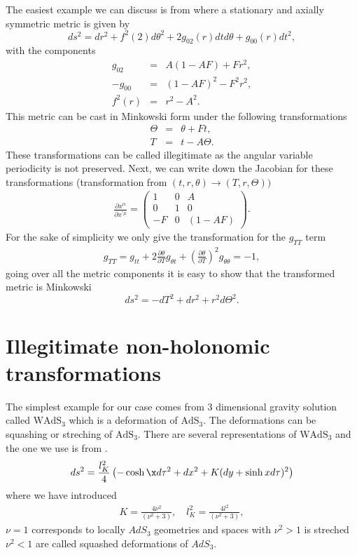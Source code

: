 \documentclass[preprint,aps,tightenlines,showkeys,nofootinbib,superscriptaddress,amsmath]{revtex4}
\begin{document}
The easiest example we can discuss is from \cite{Deser:1985pk} where a
stationary and axially symmetric metric is given by
\begin{equation}
  ds^{2}= dr^{2}+f^{2}(2)d \theta^{2}+2g_{02}(r)dt d\theta +g_{00}(r)dt^{2},
\end{equation}
with the components
\begin{eqnarray}
  g_{02}& = &A(1-AF)+Fr^{2},\\
  -g_{00}& =&(1-AF)^{2}-F^{2}r^{2},\\
  f^{2}(r)&=&r^{2}-A^{2}.
\end{eqnarray}
This metric can be cast in Minkowski form under the following transformations
\begin{eqnarray}
  \Theta &=&\theta+Ft,\\
  T &=&t-A\Theta.
\end{eqnarray}
These transformations can be called illegitimate as the angular
variable periodicity is not preserved. Next, we can write down the
Jacobian for these transformations (transformation from
$(t,r,\theta)\rightarrow (T,r,\Theta))$
\begin{eqnarray}
  \frac{\partial x^{\alpha} }{\partial x^{\prime\mu} }=
  \begin{pmatrix}
    1 & 0 & A \\
    0 & 1 & 0 \\
    -F & 0 & (1-AF)
  \end{pmatrix}.
\end{eqnarray}
For the sake of simplicity we only give the transformation for the $g_{TT}$ term
\begin{eqnarray}
  g_{TT}=g_{tt}+2 \frac{\partial\theta}{\partial T} g_{\theta
  t}+\left(\frac{\partial\theta}{\partial T}\right)^{2}g_{\theta \theta }=-1,
\end{eqnarray}
going over all the metric components it is easy to show that the
transformed metric is Minkowski
\begin{equation}
  ds^{2}=-dT^{2}+ dr^{2}+r^{2}d\Theta^{2}.
\end{equation}
\section{Illegitimate non-holonomic transformations}
The simplest example for our case comes from 3 dimensional gravity
solution called $\text{WAdS}_{3}$ which is a deformation of
$\text{AdS}_3$. The deformations can be squashing or streching of
$\text{AdS}_3$. There are several representations of
$\text{WAdS}_{3}$ and the one we use is from \cite{Giribet:2015lfa}.
\begin{equation}
  ds^{2}=\dfrac{l^{2}_K}{4}\left(-\cosh\x d\tau^{2}+dx^{2}+K(dy+\sinh
  x d\tau )^{2}   \right)\label{warpedads}
\end{equation}
where we have introduced
\begin{eqnarray}
  K=\frac{4\nu^{2}}{(\nu ^{2}+3 )},\quad l_{K}^{2}=\frac{4l^{2}
  }{(\nu ^{2}+3 )},
\end{eqnarray}
$\nu =1$ corresponds to locally $AdS_3$ geometries and spaces with
$\nu ^{2}>1$ is streched $\nu ^{2}<1$ are called squashed
deformations of $AdS_3$.
\end{document}
